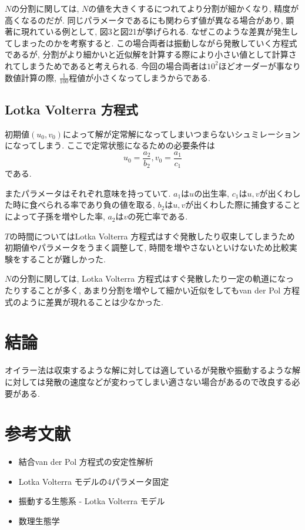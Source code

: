 \documentclass[12pt,a4paper]{jsarticle}
\begin{document}
$N$の分割に関しては, $N$の値を大きくするにつれてより分割が細かくなり, 精度が高くなるのだが. 同じパラメータであるにも関わらず値が異なる場合があり, 顕著に現れている例として, 図3と図21が挙げられる. なぜこのような差異が発生してしまったのかを考察すると. この場合両者は振動しながら発散していく方程式であるが, 分割がより細かいと近似解を計算する際により小さい値として計算されてしまうためであると考えられる. 今回の場合両者は$10^2$ほどオーダーが事なり数値計算の際, $\frac{1}{100}$程値が小さくなってしまうからである.

\subsection{Lotka Volterra 方程式}
初期値$(u_0, v_0)$によって解が定常解になってしまいつまらないシュミレーションになってしまう. ここで定常状態になるための必要条件は$$u_0 = \frac{a_2}{b_2}, v_0 = \frac{a_1}{c_1}$$である. 

またパラメータはそれぞれ意味を持っていて. $a_1$は$u$の出生率, $c_1$は$u, v$が出くわした時に食べられる率であり負の値を取る, $b_2$は$u, v$が出くわした際に捕食することによって子孫を増やした率, $a_2$は$v$の死亡率である.

$T$の時間についてはLotka Volterra 方程式はすぐ発散したり収束してしまうため初期値やパラメータをうまく調整して, 時間を増やさないといけないため比較実験をすることが難しかった.

$N$の分割に関しては, Lotka Volterra 方程式はすぐ発散したり一定の軌道になったりすることが多く, あまり分割を増やして細かい近似をしてもvan der Pol 方程式のように差異が現れることは少なかった.

\section{結論}
オイラー法は収束するような解に対しては適しているが発散や振動するような解に対しては発散の速度などが変わってしまい適さない場合があるので改良する必要がある.

\section{参考文献}
\begin{itemize}
\item 結合van der Pol 方程式の安定性解析
\item Lotka Volterra モデルの4パラメータ固定
\item 振動する生態系 - Lotka Volterra モデル
\item 数理生態学
\end{itemize}
\end{document}
